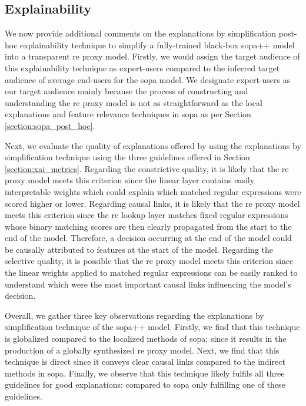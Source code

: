 \subsection{Explainability}

We now provide additional comments on the explanations by simplification
post-hoc explainability technique to simplify a fully-trained black-box \ac{sopa}++
model into a transparent \ac{re} proxy model. Firstly, we would assign the target
audience of this explainability technique as expert-users compared to the
inferred target audience of average end-users for the \ac{sopa} model. We designate
expert-users as our target audience mainly because the process of constructing
and understanding the \ac{re} proxy model is not as straightforward as the local
explanations and feature relevance techniques in \ac{sopa} as per Section
\ref{section:sopa_post_hoc}.

Next, we evaluate the quality of explanations offered by using the explanations
by simplification technique using the three guidelines offered in Section
\ref{section:xai_metrics}. Regarding the constrictive quality, it is likely that
the \ac{re} proxy model meets this criterion since the linear layer contains
easily interpretable weights which could explain which matched regular
expressions were scored higher or lower. Regarding causal links, it is likely
that the \ac{re} proxy model meets this criterion since the \ac{re} lookup layer
matches fixed regular expressions whose binary matching scores are then clearly
propagated from the start to the end of the model. Therefore, a decision
occurring at the end of the model could be causally attributed to features at
the start of the model. Regarding the selective quality, it is possible that the
\ac{re} proxy model meets this criterion since the linear weights applied to
matched regular expressions can be easily ranked to understand which were the
most important causal links influencing the model's decision.

Overall, we gather three key observations regarding the explanations by
simplification technique of the \ac{sopa}++ model. Firstly, we find that this
technique is globalized compared to the localized methods of \ac{sopa}; since it
results in the production of a globally synthesized \ac{re} proxy model. Next,
we find that this technique is direct since it conveys clear causal links
compared to the indirect methods in \ac{sopa}. Finally, we observe that this
technique likely fulfils all three guidelines for good explanations; compared to
\ac{sopa} only fulfilling one of these guidelines.


